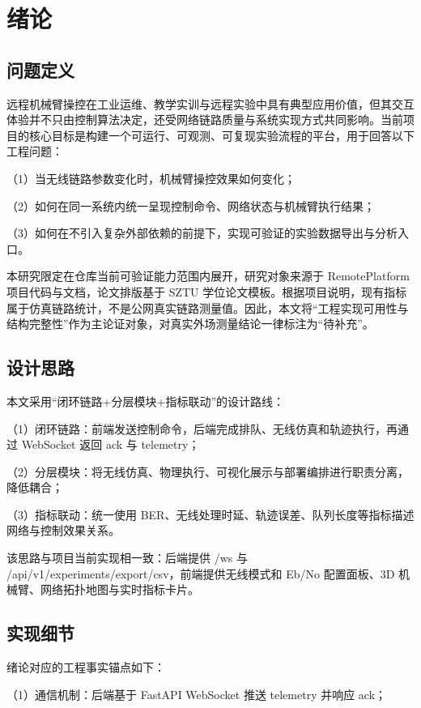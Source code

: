 
\section{绪论}

\subsection{问题定义}
远程机械臂操控在工业运维、教学实训与远程实验中具有典型应用价值，但其交互体验并不只由控制算法决定，还受网络链路质量与系统实现方式共同影响。当前项目的核心目标是构建一个可运行、可观测、可复现实验流程的平台，用于回答以下工程问题：

（1）当无线链路参数变化时，机械臂操控效果如何变化；

（2）如何在同一系统内统一呈现控制命令、网络状态与机械臂执行结果；

（3）如何在不引入复杂外部依赖的前提下，实现可验证的实验数据导出与分析入口。

本研究限定在仓库当前可验证能力范围内展开，研究对象来源于 RemotePlatform 项目代码与文档\cite{remoteplatform_repo}，论文排版基于 SZTU 学位论文模板\cite{sztu_template_repo}。根据项目说明，现有指标属于仿真链路统计，不是公网真实链路测量值。因此，本文将“工程实现可用性与结构完整性”作为主论证对象，对真实外场测量结论一律标注为“待补充”。

\subsection{设计思路}
本文采用“闭环链路+分层模块+指标联动”的设计路线：

（1）闭环链路：前端发送控制命令，后端完成排队、无线仿真和轨迹执行，再通过 WebSocket 返回 ack 与 telemetry；

（2）分层模块：将无线仿真、物理执行、可视化展示与部署编排进行职责分离，降低耦合；

（3）指标联动：统一使用 BER、无线处理时延、轨迹误差、队列长度等指标描述网络与控制效果关系。

该思路与项目当前实现相一致：后端提供 /ws 与 /api/v1/experiments/export/csv，前端提供无线模式和 Eb/No 配置面板、3D 机械臂、网络拓扑地图与实时指标卡片。

\subsection{实现细节}
绪论对应的工程事实锚点如下：

（1）通信机制：后端基于 FastAPI WebSocket 推送 telemetry 并响应 ack；

